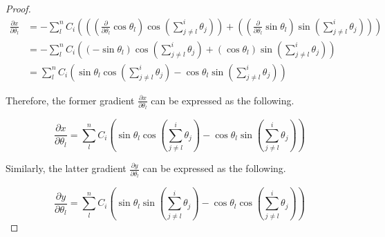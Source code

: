 \documentclass{article}
\begin{document}
\begin{proof}
  \begin{align*}
    \frac {\partial x} {\partial \theta_l}
      &=
      - \sum^n_l C_i
      \left(
        \left(
          \left(
            \frac {\partial} {\partial \theta_l} \cos \theta_l
          \right) \cos \left( \sum^i_{j \ne l} \theta_j \right)
        \right)
        +
        \left(
          \left(
            \frac {\partial} {\partial \theta_l} \sin \theta_l
          \right) \sin \left( \sum^i_{j \ne l} \theta_j \right)
        \right)
      \right) \\
      &=
      - \sum^n_l C_i
      \left(
        \left(
          - \sin \theta_l
        \right) \cos \left( \sum^i_{j \ne l} \theta_j \right)
        +
        \left(
          \cos \theta_l
        \right) \sin \left( \sum^i_{j \ne l} \theta_j \right)
      \right) \\
      &=
      \sum^n_l C_i
      \left(
        \sin \theta_l \cos \left( \sum^i_{j \ne l} \theta_j \right)
        -
        \cos \theta_l \sin \left( \sum^i_{j \ne l} \theta_j \right)
      \right)
  \end{align*}

  Therefore, the former gradient $\frac {\partial x} {\partial \theta_l}$ can be expressed as the following.

  \begin{equation}
    \frac {\partial x} {\partial \theta_l} =
      \sum^n_l C_i
      \left(
        \sin \theta_l \cos \left( \sum^i_{j \ne l} \theta_j \right)
        -
        \cos \theta_l \sin \left( \sum^i_{j \ne l} \theta_j \right)
      \right)
  \end{equation}

  Similarly, the latter gradient $\frac {\partial y} {\partial \theta_l}$ can be expressed as the following.

  \begin{equation}
    \frac {\partial y} {\partial \theta_l} =
      \sum^n_l C_i
      \left(
        \sin \theta_l \sin \left( \sum^i_{j \ne l} \theta_j \right)
        -
        \cos \theta_l \cos \left( \sum^i_{j \ne l} \theta_j \right)
      \right)
  \end{equation}
\end{proof}


\end{document}
